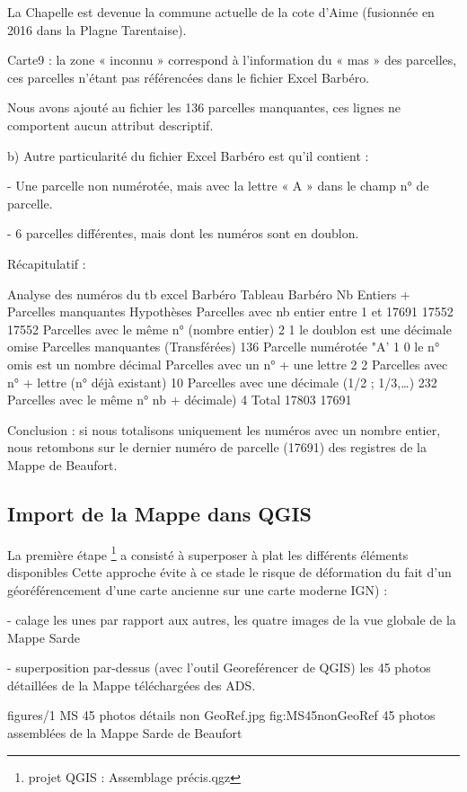 La Chapelle est devenue la commune actuelle de la cote d’Aime (fusionnée en 2016 dans la Plagne Tarentaise). 

Carte9 : la zone « inconnu » correspond à l’information du « mas » des parcelles, ces parcelles n’étant pas référencées dans le fichier Excel Barbéro. 

Nous avons ajouté au fichier les 136 parcelles manquantes, ces lignes ne comportent aucun attribut descriptif.

b)	Autre particularité du fichier Excel Barbéro est qu’il contient :

-	Une parcelle non numérotée, mais avec la lettre « A » dans le champ n° de parcelle.

-	6 parcelles différentes, mais dont les numéros sont en doublon.


Récapitulatif :

Analyse des numéros 
du tb excel Barbéro	Tableau
Barbéro	Nb Entiers
+ Parcelles
manquantes	Hypothèses
Parcelles avec nb entier entre 1 et 17691	17552	17552	
Parcelles avec le même n° (nombre entier)	2	1	le doublon est une décimale omise
Parcelles manquantes (Transférées)		136	
Parcelle numérotée "A'	1	0	le n° omis est un nombre décimal
Parcelles avec un n° + une lettre	2	2	
Parcelles avec n° + lettre (n° déjà existant)	10		
Parcelles avec une décimale (1/2 ; 1/3,…)	232		
Parcelles avec le même n° nb + décimale)	4		
Total	17803	17691	

Conclusion : si nous totalisons uniquement les numéros avec un nombre entier, nous retombons sur le dernier numéro de parcelle (17691) des registres de la Mappe de Beaufort.


\subsection{Import de la Mappe dans QGIS}

La première étape \footnote{projet QGIS : Assemblage précis.qgz} a consisté à superposer à plat les différents éléments disponibles Cette approche évite à ce stade le  risque de déformation du fait d'un géoréférencement d'une carte ancienne sur une carte moderne IGN) : 

- calage les unes par rapport aux autres, les quatre images de la vue globale de la Mappe Sarde

- superposition par-dessus (avec l'outil Georeférencer de QGIS) les 45 photos détaillées de la Mappe téléchargées des ADS. 



\cartefigure
{figures/1 MS 45 photos détails non GeoRef.jpg}
{fig:MS45nonGeoRef}
{45 photos assemblées de la Mappe Sarde de Beaufort}

